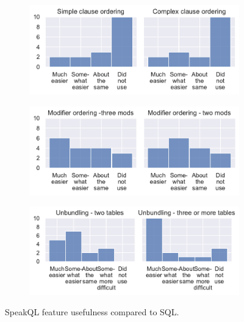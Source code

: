 \begin{figure}
\begin{subfigure}{\linewidth}
  \end{subfigure}
  \begin{subfigure}{\linewidth}
    \centering
    \includegraphics[width=\linewidth]{figures/survey-feedback/ordering-feedback-1.pdf}
  \end{subfigure}
  \begin{subfigure}{\linewidth}
    \centering
    \includegraphics[width=\linewidth]{figures/survey-feedback/ordering-feedback-2.pdf}
  \end{subfigure}
  \begin{subfigure}{\linewidth}
    \centering
    \includegraphics[width=\linewidth]{figures/survey-feedback/unbundling-feedback.pdf}
  \end{subfigure}
  \caption{SpeakQL feature usefulness compared to SQL.}
  \label{fig:surveyusefulnessgraphs}
\end{figure}


